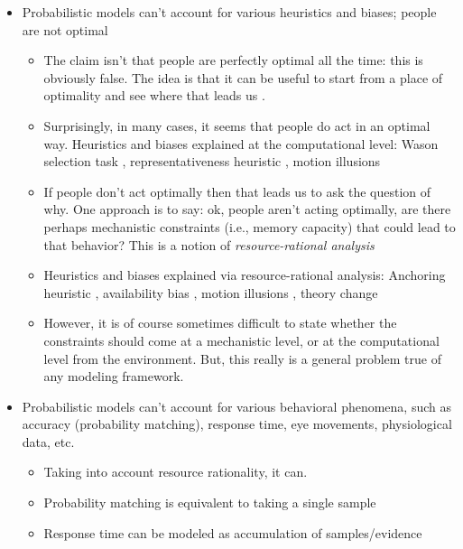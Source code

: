 \documentclass[12pt]{article}
\begin{document}
\begin{itemize}
\item Probabilistic models can't account for various heuristics and biases; people are not optimal \citep{Kahneman1973,Tversky1974,Marcus2013}
    \begin{itemize}
    \item The claim isn't that people are perfectly optimal all the time: this is obviously false. The idea is that it can be useful to start from a place of optimality and see where that leads us \citep{Jacobs2011,Battaglia2012}.
    \item Surprisingly, in many cases, it seems that people do act in an optimal way. Heuristics and biases explained at the computational level: Wason selection task \citep{Chater1999}, representativeness heuristic \citep{Tenenbaum2001}, motion illusions \citep{Weiss2002}
    \item If people don't act optimally then that leads us to ask the question of why. One approach is to say: ok, people aren't acting optimally, are there perhaps mechanistic constraints (i.e., memory capacity) that could lead to that behavior? This is a notion of \textit{resource-rational analysis} \citep{Griffiths2015}
    \item Heuristics and biases explained via resource-rational analysis: Anchoring heuristic \citep{Lieder2012}, availability bias \citep{Lieder2014}, motion illusions \citep{Weiss2002}, theory change \citep{Ullman2012}
    \item However, it is of course sometimes difficult to state whether the constraints should come at a mechanistic level, or at the computational level from the environment. But, this really is a general problem true of any modeling framework.
    \end{itemize}

\item Probabilistic models can't account for various behavioral phenomena, such as accuracy (probability matching), response time, eye movements, physiological data, etc. \citep{Jones2011}
    \begin{itemize}
    \item Taking into account resource rationality, it can. \citep{Griffiths2015}
    \item Probability matching is equivalent to taking a single sample \citep{Vul2014}
    \item Response time can be modeled as accumulation of samples/evidence \citep{Bitzer2014}
    \end{itemize}


\end{itemize}
\end{document}
